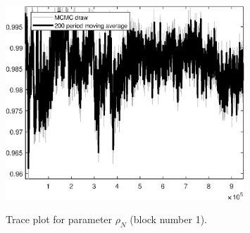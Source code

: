 \begin{figure}[H]
\centering
  \includegraphics[width=0.8\textwidth]{BRS_growth_util_sectoral/graphs/TracePlot_rho_N_blck_1}\\
    \caption{Trace plot for parameter ${\rho_N}$ (block number 1).}
\end{figure}

